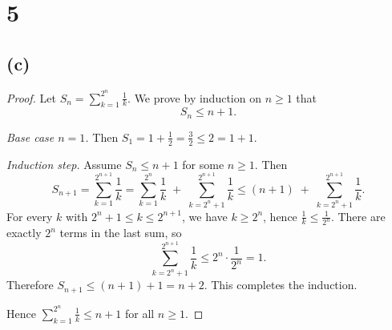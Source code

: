 \documentclass[12pt,a4paper]{article}
\theoremstyle{definition}
\theoremstyle{remark}
\begin{document}
\section*{5}
\subsection*{(c)}
\begin{proof}
Let \(S_n = \sum_{k=1}^{2^{n}} \frac{1}{k}\). We prove by induction on \(n \ge 1\) that
\[
S_n \le n+1.
\]

\emph{Base case \(n=1\).} Then \(S_1 = 1 + \tfrac12 = \tfrac32 \le 2 = 1+1\).

\emph{Induction step.} Assume \(S_n \le n+1\) for some \(n \ge 1\). Then
\[
S_{n+1}
= \sum_{k=1}^{2^{n+1}} \frac{1}{k}
= \sum_{k=1}^{2^{n}} \frac{1}{k} \;+\; \sum_{k=2^{n}+1}^{2^{n+1}} \frac{1}{k}
\le (n+1) \;+\; \sum_{k=2^{n}+1}^{2^{n+1}} \frac{1}{k}.
\]
For every \(k\) with \(2^{n}+1 \le k \le 2^{n+1}\), we have \(k \ge 2^{n}\), hence \(\frac{1}{k} \le \frac{1}{2^{n}}\).
There are exactly \(2^{n}\) terms in the last sum, so
\[
\sum_{k=2^{n}+1}^{2^{n+1}} \frac{1}{k} \le 2^{n} \cdot \frac{1}{2^{n}} = 1.
\]
Therefore \(S_{n+1} \le (n+1) + 1 = n+2\). This completes the induction.

Hence \(\displaystyle \sum_{k=1}^{2^{n}} \frac{1}{k} \le n+1\) for all \(n \ge 1\).
\end{proof}
\end{document}
